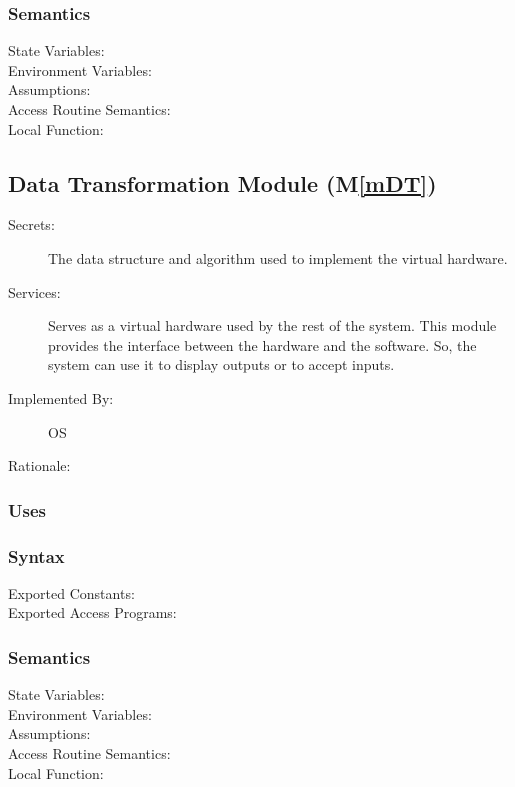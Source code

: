 \documentclass[12pt, titlepage]{article}
\newcommand{\mref}[1]{M\ref{#1}}
\begin{document}
\begin{description}
\begin{description}
\subsubsection{Semantics}
\begin{description}
  \item[State Variables:]
  \item[Environment Variables:]  
  \item[Assumptions:] 
  \item[Access Routine Semantics:] 
  \item[Local Function:] 
\end{description}

\subsection{Data Transformation Module (\mref{mDT})}
\begin{description}
  \item[Secrets:]The data structure and algorithm used to implement the virtual
    hardware.
  \item[Services:]Serves as a virtual hardware used by the rest of the
    system. This module provides the interface between the hardware and the
    software. So, the system can use it to display outputs or to accept inputs.
  \item[Implemented By:] OS
  \item[Rationale:] 
\end{description}

\subsubsection{Uses}

\subsubsection{Syntax}
\begin{description}
  \item[Exported Constants:] 
  \item[Exported Access Programs:] 
\end{description}

\subsubsection{Semantics}
\begin{description}
  \item[State Variables:]
  \item[Environment Variables:]  
  \item[Assumptions:] 
  \item[Access Routine Semantics:] 
  \item[Local Function:] 
\end{description}


\end{description}
\end{description}
\end{document}
